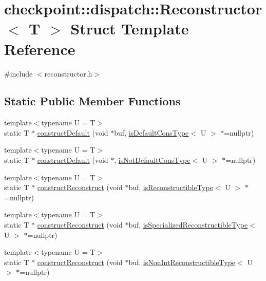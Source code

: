 \hypertarget{structcheckpoint_1_1dispatch_1_1_reconstructor}{}\section{checkpoint\+:\+:dispatch\+:\+:Reconstructor$<$ T $>$ Struct Template Reference}
\label{structcheckpoint_1_1dispatch_1_1_reconstructor}


{\ttfamily \#include $<$reconstructor.\+h$>$}

\subsection*{Static Public Member Functions}
\begin{DoxyCompactItemize}
\item 
{\footnotesize template$<$typename U  = T$>$ }\\static T $\ast$ \hyperlink{structcheckpoint_1_1dispatch_1_1_reconstructor_af09a6d0312dbed7c8a311350b689794d}{construct\+Default} (void $\ast$buf, \hyperlink{namespacecheckpoint_a58224a3b056d9e2aa73d563871981a7d}{is\+Default\+Cons\+Type}$<$ U $>$ $\ast$=nullptr)
\item 
{\footnotesize template$<$typename U  = T$>$ }\\static T $\ast$ \hyperlink{structcheckpoint_1_1dispatch_1_1_reconstructor_abbdc865e73cc1a41a816525d1bd5f507}{construct\+Default} (void $\ast$, \hyperlink{namespacecheckpoint_a4032c86e7c92702198dd675a2696ee2c}{is\+Not\+Default\+Cons\+Type}$<$ U $>$ $\ast$=nullptr)
\item 
{\footnotesize template$<$typename U  = T$>$ }\\static T $\ast$ \hyperlink{structcheckpoint_1_1dispatch_1_1_reconstructor_a86a95e9ca24e30a627ed6626f19db4a2}{construct\+Reconstruct} (void $\ast$buf, \hyperlink{namespacecheckpoint_a126da7cae6bbbec231bb2552dc3ad6cc}{is\+Reconstructible\+Type}$<$ U $>$ $\ast$=nullptr)
\item 
{\footnotesize template$<$typename U  = T$>$ }\\static T $\ast$ \hyperlink{structcheckpoint_1_1dispatch_1_1_reconstructor_a4c1529ff50346df55cd3abd98e375cdd}{construct\+Reconstruct} (void $\ast$buf, \hyperlink{namespacecheckpoint_a30b2672bbbe0c21d2b88edb1ddaec19a}{is\+Specialized\+Reconstructible\+Type}$<$ U $>$ $\ast$=nullptr)
\item 
{\footnotesize template$<$typename U  = T$>$ }\\static T $\ast$ \hyperlink{structcheckpoint_1_1dispatch_1_1_reconstructor_ad1362a1e66b441a04e4bb4b7245eb3c4}{construct\+Reconstruct} (void $\ast$buf, \hyperlink{namespacecheckpoint_a46b7909fb0fef92b4787567fde7c760b}{is\+Non\+Int\+Reconstructible\+Type}$<$ U $>$ $\ast$=nullptr)

\end{DoxyCompactItemize}
